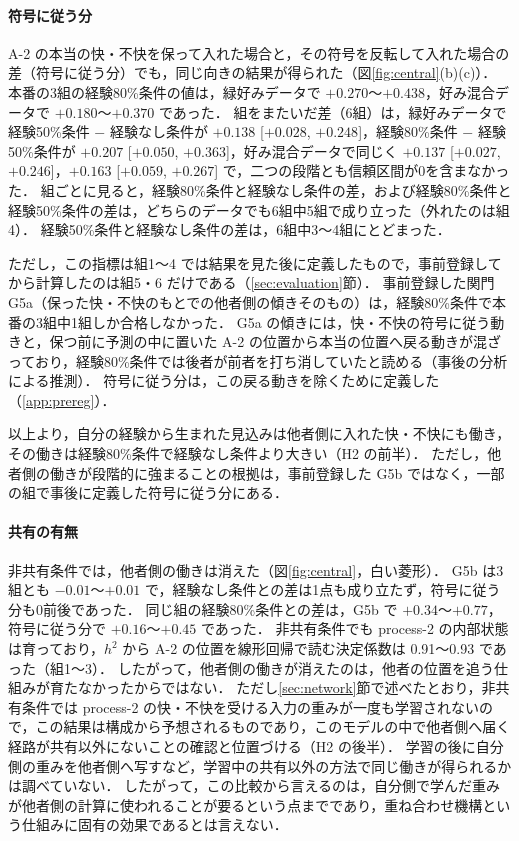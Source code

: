 \paragraph{符号に従う分}
A-2 の本当の快・不快を保って入れた場合と，その符号を反転して入れた場合の差（符号に従う分）でも，同じ向きの結果が得られた（図\ref{fig:central}(b)(c)）．
本番の3組の経験80\%条件の値は，緑好みデータで $+0.270$〜$+0.438$，好み混合データで $+0.180$〜$+0.370$ であった．
組をまたいだ差（6組）は，緑好みデータで経験50\%条件 $-$ 経験なし条件が $+0.138$ [$+0.028$, $+0.248$]，経験80\%条件 $-$ 経験50\%条件が $+0.207$ [$+0.050$, $+0.363$]，好み混合データで同じく $+0.137$ [$+0.027$, $+0.246$]，$+0.163$ [$+0.059$, $+0.267$] で，二つの段階とも信頼区間が0を含まなかった．
組ごとに見ると，経験80\%条件と経験なし条件の差，および経験80\%条件と経験50\%条件の差は，どちらのデータでも6組中5組で成り立った（外れたのは組4）．
経験50\%条件と経験なし条件の差は，6組中3〜4組にとどまった．

ただし，この指標は組1〜4 では結果を見た後に定義したもので，事前登録してから計算したのは組5・6 だけである（\ref{sec:evaluation}節）．
事前登録した関門 G5a（保った快・不快のもとでの他者側の傾きそのもの）は，経験80\%条件で本番の3組中1組しか合格しなかった．
G5a の傾きには，快・不快の符号に従う動きと，保つ前に予測の中に置いた A-2 の位置から本当の位置へ戻る動きが混ざっており，経験80\%条件では後者が前者を打ち消していたと読める（事後の分析による推測）．
符号に従う分は，この戻る動きを除くために定義した（\ref{app:prereg}）．

以上より，自分の経験から生まれた見込みは他者側に入れた快・不快にも働き，その働きは経験80\%条件で経験なし条件より大きい（H2 の前半）．
ただし，他者側の働きが段階的に強まることの根拠は，事前登録した G5b ではなく，一部の組で事後に定義した符号に従う分にある．

\paragraph{共有の有無}
非共有条件では，他者側の働きは消えた（図\ref{fig:central}，白い菱形）．
G5b は3組とも $-0.01$〜$+0.01$ で，経験なし条件との差は1点も成り立たず，符号に従う分も0前後であった．
同じ組の経験80\%条件との差は，G5b で $+0.34$〜$+0.77$，符号に従う分で $+0.16$〜$+0.45$ であった．
非共有条件でも process-2 の内部状態は育っており，$h^2$ から A-2 の位置を線形回帰で読む決定係数は 0.91〜0.93 であった（組1〜3）．
したがって，他者側の働きが消えたのは，他者の位置を追う仕組みが育たなかったからではない．
ただし\ref{sec:network}節で述べたとおり，非共有条件では process-2 の快・不快を受ける入力の重みが一度も学習されないので，この結果は構成から予想されるものであり，このモデルの中で他者側へ届く経路が共有以外にないことの確認と位置づける（H2 の後半）．
学習の後に自分側の重みを他者側へ写すなど，学習中の共有以外の方法で同じ働きが得られるかは調べていない．
したがって，この比較から言えるのは，自分側で学んだ重みが他者側の計算に使われることが要るという点までであり，重ね合わせ機構という仕組みに固有の効果であるとは言えない．

